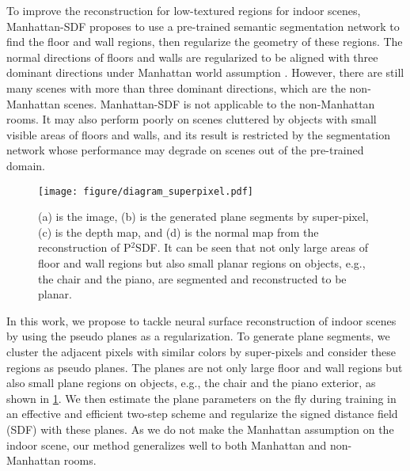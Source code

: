 \documentclass[10pt,journal,compsoc]{IEEEtran}
\begin{document}
	To improve the reconstruction for low-textured regions for indoor scenes, Manhattan-SDF \cite{guo2022neural} proposes to use a pre-trained semantic segmentation network to find the floor and wall regions, then regularize the geometry of these regions. The normal directions of floors and walls are regularized to be aligned with three dominant directions under Manhattan world assumption \cite{coughlan1999manhattan}. However, there are still many scenes with more than three dominant directions, which are the non-Manhattan scenes. Manhattan-SDF is not applicable to the non-Manhattan rooms. It may also perform poorly on scenes cluttered by objects with small visible areas of floors and walls, and its result is restricted by the segmentation network whose performance may degrade on scenes out of the pre-trained domain. 
	\begin{figure}[htbp]
		\centering
		\texttt{[image: figure/diagram\_superpixel.pdf]}
		\caption{
			(a) is the image, (b) is the generated plane segments by super-pixel, (c) is the depth map, and (d) is the normal map from the reconstruction of P$^2$SDF. It can be seen that not only large areas of floor and wall regions but also small planar regions on objects, e.g., the chair and the piano, are segmented and reconstructed to be planar.
		}
		\label{fig:superpixel}
	\end{figure}
	In this work, we propose to tackle neural surface reconstruction of indoor scenes by using the pseudo planes as a regularization. To generate plane segments, we cluster the adjacent pixels with similar colors by super-pixels \cite{felzenszwalb2004efficient} and consider these regions as pseudo planes. The planes are not only large floor and wall regions but also small plane regions on objects, e.g., the chair and the piano exterior, as shown in \cref{fig:superpixel}. We then estimate the plane parameters on the fly during training in an effective and efficient two-step scheme and regularize the signed distance field (SDF) with these planes. As we do not make the Manhattan assumption on the indoor scene, our method generalizes well to both Manhattan and non-Manhattan rooms. 
	
\end{document}
